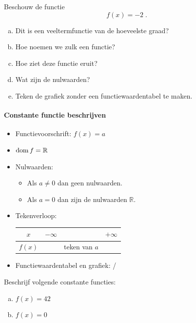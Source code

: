\documentclass[12pt]{article}
\begin{document}
\begin{oefening}
Beschouw de functie 
$$f(x)=-2\;.$$
\begin{enumerate}[(a)]
  \item Dit is een veeltermfunctie van de hoeveelste graad?
  \item Hoe noemen we zulk een functie?
  \item Hoe ziet deze functie eruit?
  \item Wat zijn de nulwaarden?
  \item Teken de grafiek zonder een functiewaardentabel te maken.
\end{enumerate}
\end{oefening}

\paragraph*{Constante functie beschrijven}
\begin{mdframed}
\begin{itemize}
  \item Functievoorschrift: $f(x)=a$
  \item $\dom f = \mathbb{R}$
  \item Nulwaarden:
  \begin{itemize}
    \item Als $a\neq 0$ dan geen nulwaarden.
    \item Als $a=0$ dan zijn de nulwaarden $\mathbb{R}$.
  \end{itemize}
  \item Tekenverloop:
  \begin{center}
    \begin{tabular}{c|lcr}
    $x$ & $-\infty$ & & $+\infty$\\
    \hline
    $f(x)$ & & teken van $a$ &       
    \end{tabular}
  \end{center}
  \item Functiewaardentabel en grafiek: /
\end{itemize}
\end{mdframed}

\begin{oefening}
Beschrijf volgende constante functies:
\begin{enumerate}[(a)]
  \item $f(x)=42$
  \item $f(x)=0$
\end{enumerate}
\end{oefening}
\end{document}
